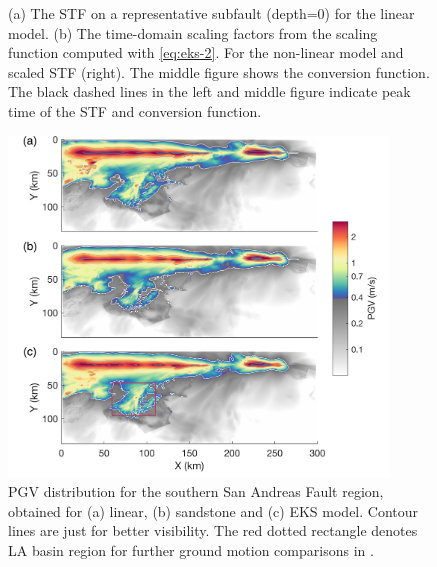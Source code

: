\clearpage
\begin{figure}[!ht]
     \hfil
     \hfil
    \caption{(a) The STF on a representative subfault (depth=0) for the linear model. (b) The time-domain scaling factors from the scaling function computed with \cref{eq:eks-2}. For the non-linear model and scaled STF (right). The middle figure shows the conversion function. The black dashed lines in the left and middle figure indicate peak time of the STF and conversion function.}
    \label{fig:eks-3}
\end{figure}
\clearpage

\clearpage
\begin{figure}[!ht]
    \includegraphics[width=0.9\textwidth]{figures/figure_eks_4.png}
    \caption{PGV distribution for the southern San Andreas Fault region, obtained for (a) linear, (b) sandstone and (c) EKS model. Contour lines are just for better visibility. The red dotted rectangle denotes LA basin region for further ground motion comparisons in .}
    \label{fig:eks-4}
\end{figure}


